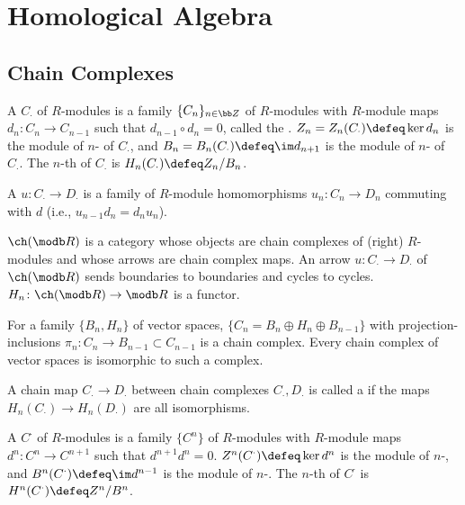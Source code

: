 \section{Homological Algebra}\cite{weibel}
\subsection{Chain Complexes}
A  $C_\cdot$ of $R$-modules is a family $\{ C_n \}_{n \in \bb Z}$ of $R$-modules with $R$-module maps $d_n \colon C_n \to C_{n-1}$ such that $d_{n-1} \circ d_{n} = 0$, called the . $Z_n = Z_n(C_\cdot) \defeq \ker d_n$ is the module of $n$- of $C_\cdot$, and $B_n = B_n(C_\cdot) \defeq \im d_{n+1}$ is the module of $n$- of $C_\cdot$. The $n$-th  of $C_\cdot$ is $H_n(C_\cdot) \defeq Z_n / B_n$.

A  $u \colon C_\cdot \to D_\cdot$ is a family of $R$-module homomorphisms $u_n \colon C_n \to D_n$ commuting with $d$ (i.e., $u_{n-1}d_n = d_n u_n$).

$\ch(\modb R)$ is a category whose objects are chain complexes of (right) $R$-modules and whose arrows are chain complex maps. An arrow $u \colon C_\cdot \to D_\cdot$ of $\ch(\modb R)$ sends boundaries to boundaries and cycles to cycles. $H_n \colon \ch(\modb R) \to \modb R$ is a functor.

For a family $\{ B_n, H_n \}$ of vector spaces, $\{ C_n = B_n \oplus H_n \oplus B_{n-1} \}$ with projection-inclusions $\pi_n \colon C_n \to B_{n-1} \subset C_{n-1}$ is a chain complex. Every chain complex of vector spaces is isomorphic to such a complex.

A chain map $C_\cdot \to D_\cdot$ between chain complexes $C_\cdot, D_\cdot$ is called a  if the maps $H_n(C_\cdot) \to H_n(D_\cdot)$ are all isomorphisms.

A  $C^\cdot$ of $R$-modules is a family $\{C^n\}$ of $R$-modules with $R$-module maps $d^n \colon C^n \to C^{n+1}$ such that $d^{n+1}d^n = 0$. $Z^n(C^\cdot) \defeq \ker d^n$ is the module of $n$-, and $B^n(C^\cdot) \defeq \im d^{n-1}$ is the module of $n$-. The $n$-th  of $C^\cdot$ is $H^n(C^\cdot) \defeq Z^n/B^n$.
